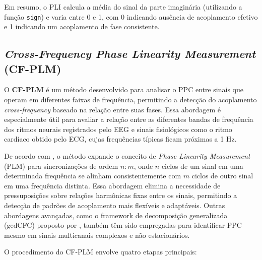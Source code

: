 Em resumo, o PLI calcula a média do sinal da parte imaginária (utilizando a função \texttt{sign}) e varia entre 0 e 1, com 0 indicando ausência de acoplamento efetivo e 1 indicando um acoplamento de fase consistente.

\subsection{\textit{Cross-Frequency Phase Linearity Measurement} (CF-PLM)}
O \textbf{CF-PLM} é um método desenvolvido para analisar o PPC entre sinais que operam em diferentes faixas de frequência, permitindo a detecção do acoplamento \textit{cross-frequency} baseado na relação entre suas fases. Essa abordagem é especialmente útil para avaliar a relação entre as diferentes bandas de frequência dos ritmos neurais registrados pelo EEG e sinais fisiológicos como o ritmo cardíaco obtido pelo ECG, cujas frequências típicas ficam próximas a 1 Hz.

De acordo com , o método expande o conceito de \textit{Phase Linearity Measurement} (PLM) para sincronizações de ordem \(n:m\), onde \(n\) ciclos de um sinal em uma determinada frequência se alinham consistentemente com \(m\) ciclos de outro sinal em uma frequência distinta. Essa abordagem elimina a necessidade de pressuposições sobre relações harmônicas fixas entre os sinais, permitindo a detecção de padrões de acoplamento mais flexíveis e adaptáveis. Outras abordagens avançadas, como o framework de decomposição generalizada (gedCFC) proposto por , também têm sido empregadas para identificar PPC mesmo em sinais multicanais complexos e não estacionários.

O procedimento do CF-PLM envolve quatro etapas principais:

